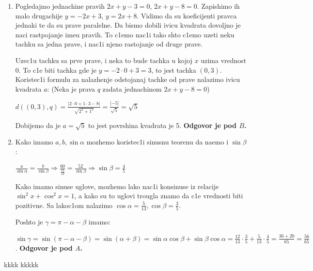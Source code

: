 \documentclass[a4paper,12pt]{article}
\begin{document}
\begin{enumerate}[1.]
\item Pogledajmo jednachine pravih $2x + y - 3 = 0$, $2x +y -8 = 0$. Zapishimo ih malo drugachije $y = -2x +3$, $y=  2x + 8$. Vidimo da su koeficijenti pravca jednaki te da su prave paralelne. Da bismo dobili ivicu kvadrata dovoljno je naci rastpojanje ime\dj{}u pravih. To c1emo nac1i tako shto c1emo uzeti neku tachku sa jedna prave, i nac1i njeno rastojanje od druge prave.
\par Uzec1u tachku sa prve prave, i neka to bude tachka u kojoj $x$ uzima vrednost 0. To c1e biti tachka gde je $y = -2 \cdot 0 +3 = 3$, to jest tachka $(0,3)$. Koristec1i formulu za nalazhenje odstojanaj tachke od prave nalazimo ivicu kvadrata $a$: (Neka je prava $q$ zadata jednachinom $ 2x+y-8 = 0$)
\par $d((0,3), q) = \frac{|2 \cdot 0 + 1 \cdot 3 -8|}{\sqrt{2^2 + 1^2}} = \frac{|-5|}{\sqrt{5}} = \sqrt{5}$
\par Dobijemo da je $a = \sqrt{5}$ to jest povrshina kvadrata je 5. \textbf{Odgovor je pod $B$.} 


\item Kako imamo $a,b,\sin{\alpha} $ mozhemo koristec1i sinusnu teorenu da na\dj{}emo i $\sin{\beta}$:
\par $ \frac{a}{\sin{\alpha}}= \frac{b}{\sin{\beta}}  \Longrightarrow \frac{60}{\frac{12}{13}}= \frac{52}{\sin{\beta}} \Longrightarrow \sin{\beta} = \frac{4}{5} $
\par Kako imamo sinuse uglove, mozhemo lako nac1i konsinuse iz relacije $\sin^2  x  +\cos^2  x  = 1$, a kako su to uglovi trougla znamo da c1e vrednosti biti pozitivne. Sa lakoc1om nalazimo $\cos{\alpha} = \frac{5}{13}, \cos{\beta} = \frac{3}{5} $.
\par Poshto je $\gamma = \pi - \alpha - \beta$ imamo: 
\par $\sin{\gamma} = \sin(\pi - \alpha - \beta)= \sin( \alpha + \beta) = \sin{\alpha}\cos{\beta} + \sin{\beta} \cos{\alpha} = \frac{12}{13}\cdot \frac{3}{5} + \frac{5}{13}  \cdot \frac{4}{5} = \frac{36+20}{65} = \frac{56}{65} $. \textbf{Odgovor je pod $A$.}


\end{enumerate}
\newpage


\begin{thebibliography}{9}
 kkkk
 kkkkk

\end{thebibliography}
\end{document}
